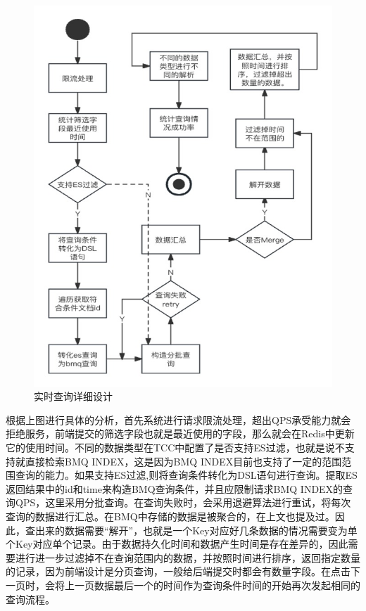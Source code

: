   \begin{figure}[htb]
  \centering
  \includegraphics[width=5in]{figure/chapter4/实时查询详细设计.jpg}
  \caption{实时查询详细设计}\label{shishichaxunxiangxi}
\end{figure}

根据上图进行具体的分析，首先系统进行请求限流处理，超出QPS承受能力就会拒绝服务，前端提交的筛选字段也就是最近使用的字段，那么就会在Redis中更新它的使用时间。不同的数据类型在TCC中配置了是否支持ES过滤，也就是说不支持就直接检索BMQ INDEX，这是因为BMQ INDEX目前也支持了一定的范围范围查询的能力。如果支持ES过滤,则将查询条件转化为DSL语句进行查询。提取ES返回结果中的id和time来构造BMQ查询条件，并且应限制请求BMQ INDEX的查询QPS，这里采用分批查询。在查询失败时，会采用退避算法进行重试，将每次查询的数据进行汇总。在BMQ中存储的数据是被聚合的，在上文也提及过。因此，查出来的数据需要“解开”，也就是一个Key对应好几条数据的情况需要变为单个Key对应单个记录。由于数据持久化时间和数据产生时间是存在差异的，因此需要进行进一步过滤掉不在查询范围内的数据，并按照时间进行排序，返回指定数量的记录，因为前端设计是分页查询，一般给后端提交时都会有数量字段。在点击下一页时，会将上一页数据最后一个的时间作为查询条件时间的开始再次发起相同的查询流程。

